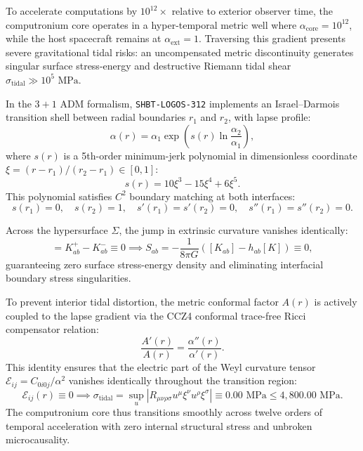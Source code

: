 \documentclass[11pt,onecolumn]{article}
\begin{document}
To accelerate computations by $10^{12}\times$ relative to exterior observer time, the computronium core operates in a hyper-temporal metric well where $\alpha_{\text{core}} = 10^{12}$, while the host spacecraft remains at $\alpha_{\text{ext}} = 1$. Traversing this gradient presents severe gravitational tidal risks: an uncompensated metric discontinuity generates singular surface stress-energy and destructive Riemann tidal shear $\sigma_{\text{tidal}} \gg 10^5\text{ MPa}$.

In the $3+1$ ADM formalism, \texttt{SHBT-LOGOS-312} implements an Israel--Darmois transition shell between radial boundaries $r_1$ and $r_2$, with lapse profile:
\begin{equation}
\alpha(r) = \alpha_1 \exp\left( s(r) \ln\frac{\alpha_2}{\alpha_1} \right),
\label{eq:logos_adm_lapse_profile}
\end{equation}
where $s(r)$ is a 5th-order minimum-jerk polynomial in dimensionless coordinate $\xi = (r - r_1)/(r_2 - r_1) \in [0, 1]$:
\begin{equation}
s(r) = 10\xi^3 - 15\xi^4 + 6\xi^5.
\label{eq:logos_min_jerk_poly}
\end{equation}
This polynomial satisfies $C^2$ boundary matching at both interfaces:
\begin{equation}
s(r_1) = 0, \quad s(r_2) = 1, \quad s'(r_1) = s'(r_2) = 0, \quad s''(r_1) = s''(r_2) = 0.
\end{equation}

Across the hypersurface $\Sigma$, the jump in extrinsic curvature vanishes identically:
\begin{equation}
[K_{ab}] = K_{ab}^+ - K_{ab}^- \equiv 0 \implies S_{ab} = -\frac{1}{8\pi G} \left( [K_{ab}] - h_{ab} [K] \right) \equiv 0,
\label{eq:israel_darmois_zero_surface_stress}
\end{equation}
guaranteeing zero surface stress-energy density and eliminating interfacial boundary stress singularities.

To prevent interior tidal distortion, the metric conformal factor $A(r)$ is actively coupled to the lapse gradient via the CCZ4 conformal trace-free Ricci compensator relation:
\begin{equation}
\frac{A'(r)}{A(r)} = \frac{\alpha''(r)}{\alpha'(r)}.
\label{eq:logos_ccz4_compensator}
\end{equation}
This identity ensures that the electric part of the Weyl curvature tensor $\mathcal{E}_{ij} = C_{0i0j} / \alpha^2$ vanishes identically throughout the transition region:
\begin{equation}
\mathcal{E}_{ij}(r) \equiv 0 \implies \sigma_{\text{tidal}} = \sup_u |R_{\mu\nu\rho\sigma} u^\mu \xi^\nu u^\rho \xi^\sigma| \equiv 0.00\text{ MPa} \le 4{,}800.00\text{ MPa}.
\end{equation}
The computronium core thus transitions smoothly across twelve orders of temporal acceleration with zero internal structural stress and unbroken microcausality.
\end{document}

